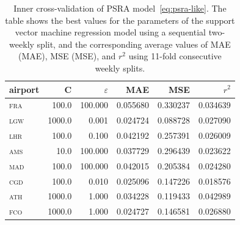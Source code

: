 \documentclass[final,review]{elsarticle}
\newcommand{\airp}[1]{\textcolor{#1}{\textsc{#1}}}
\begin{document}
\begin{table}
  \caption{Inner cross-validation of \acs{PSRA} model~\eqref{eq:psra-like}. The table shows the best values for the parameters of the support vector machine regression model using a sequential two-weekly split, and the corresponding average values of \acl{MAE} (\acs{MAE}), \acl{MSE} (\acs{MSE}), and \(r^2\) using 11-fold consecutive weekly splits.}\label{tab:inner_cv}
  \centering
  \begin{tabular}{lrrrrr}
    \toprule
    airport &       C &    \(\varepsilon\) &       \acs{MAE} &       \acs{MSE} &        \(r^2\) \\
    \midrule
    \airp{fra} &   100.0 &  100.000 &  0.055680 &  0.330237 &  0.034639 \\
    \airp{lgw} &  1000.0 &    0.001 &  0.024724 &  0.088728 &  0.027090 \\
    \airp{lhr} &   100.0 &    0.100 &  0.042192 &  0.257391 &  0.026009 \\
    \airp{ams} &    10.0 &  100.000 &  0.037729 &  0.296439 &  0.023622 \\
    \airp{mad} &   100.0 &  100.000 &  0.042015 &  0.205384 &  0.024280 \\
    \airp{cgd} &   100.0 &    0.010 &  0.025096 &  0.147226 &  0.018576 \\
    \airp{ath} &  1000.0 &    1.000 &  0.034228 &  0.119433 &  0.042989 \\
    \airp{fco} &  1000.0 &    1.000 &  0.024727 &  0.146581 &  0.026880 \\
    \bottomrule
  \end{tabular}
\end{table}
\end{document}
